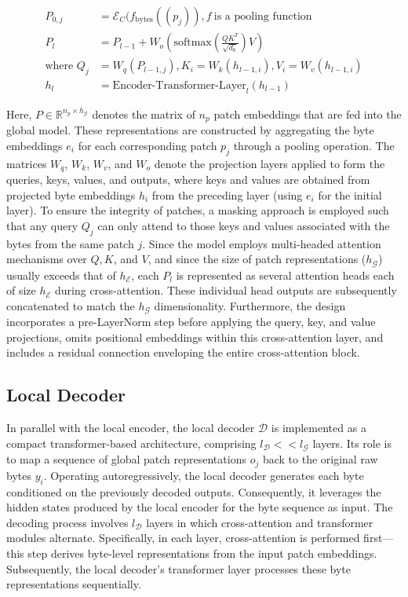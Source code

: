 \begin{align}
P_{0,j} &= \mathcal{E}_{C}(f_\text{bytes}((p_j)), f~ \text{is a pooling function} \\
P_l &= P_{l-1} + W_o\left(\text{softmax}\left(\frac{QK^T}{\sqrt{d_k}}\right)V\right) \\
\text{where } Q_j &= W_q(P_{l-1,j}), K_i = W_k(h_{l-1,i}), V_i = W_v(h_{l-1,i}) \\
h_l &= \text{Encoder-Transformer-Layer}_l(h_{l-1})
\end{align}

Here, $P \in \mathbb{R}^{n_p \times h_{\mathcal{G}}}$ denotes the matrix of $n_p$ patch embeddings that are fed into the global model. These representations are constructed by aggregating the byte embeddings $e_i$ for each corresponding patch $p_j$ through a pooling operation. The matrices $W_q$, $W_k$, $W_v$, and $W_o$ denote the projection layers applied to form the queries, keys, values, and outputs, where keys and values are obtained from projected byte embeddings $h_i$ from the preceding layer (using $e_i$ for the initial layer). To ensure the integrity of patches, a masking approach is employed such that any query $Q_j$ can only attend to those keys and values associated with the bytes from the same patch $j$. Since the model employs multi-headed attention mechanisms over $Q, K$, and $V$, and since the size of patch representations ($h_{\mathcal{G}}$) usually exceeds that of $h_{\mathcal{E}}$, each $P_l$ is represented as several attention heads each of size $h_{\mathcal{E}}$ during cross-attention. These individual head outputs are subsequently concatenated to match the $h_{\mathcal{G}}$ dimensionality. Furthermore, the design incorporates a pre-LayerNorm step before applying the query, key, and value projections, omits positional embeddings within this cross-attention layer, and includes a residual connection enveloping the entire cross-attention block.

\subsection{Local Decoder} 

In parallel with the local encoder, the local decoder $\mathcal{D}$ is implemented as a compact transformer-based architecture, comprising $l_{\mathcal{D}} << l_{\mathcal{G}}$ layers. Its role is to map a sequence of global patch representations $o_j$ back to the original raw bytes $y_i$. Operating autoregressively, the local decoder generates each byte conditioned on the previously decoded outputs. Consequently, it leverages the hidden states produced by the local encoder for the byte sequence as input. The decoding process involves $l_{\mathcal{D}}$ layers in which cross-attention and transformer modules alternate. Specifically, in each layer, cross-attention is performed first—this step derives byte-level representations from the input patch embeddings. Subsequently, the local decoder’s transformer layer processes these byte representations sequentially.

